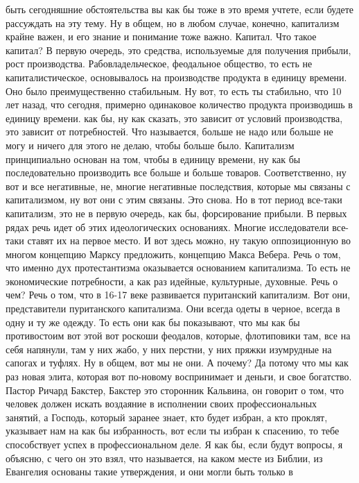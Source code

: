 быть сегодняшние обстоятельства вы как бы тоже в это время учтете, если будете
рассуждать на эту тему. Ну в общем, но в любом случае, конечно, капитализм
крайне важен, и его знание и понимание тоже важно. Капитал. Что такое капитал? В
первую очередь, это средства, используемые для получения прибыли, рост
производства. Рабовладельческое, феодальное общество, то есть не
капиталистическое, основывалось на производстве продукта в единицу времени. Оно
было преимущественно стабильным. Ну вот, то есть ты стабильно, что 10 лет назад,
что сегодня, примерно одинаковое количество продукта производишь в единицу
времени. как бы, ну как сказать, это зависит от условий производства, это
зависит от потребностей. Что называется, больше не надо или больше не могу и
ничего для этого не делаю, чтобы больше было. Капитализм принципиально основан
на том, чтобы в единицу времени, ну как бы последовательно производить все
больше и больше товаров. Соответственно, ну вот и все негативные, не, многие
негативные последствия, которые мы связаны с капитализмом, ну вот они с этим
связаны. Это снова. Но в тот период все-таки капитализм, это не в первую
очередь, как бы, форсирование прибыли. В первых рядах речь идет об этих
идеологических основаниях. Многие исследователи все-таки ставят их на первое
место. И вот здесь можно, ну такую оппозиционную во многом концепцию Марксу
предложить, концепцию Макса Вебера. Речь о том, что именно дух протестантизма
оказывается основанием капитализма. То есть не экономические потребности, а как
раз идейные, культурные, духовные. Речь о чем? Речь о том, что в 16-17 веке
развивается пуританский капитализм. Вот они, представители пуританского
капитализма. Они всегда одеты в черное, всегда в одну и ту же одежду. То есть
они как бы показывают, что мы как бы противостоим вот этой вот роскоши феодалов,
которые, флотиповики там, все на себя напянули, там у них жабо, у них перстни, у
них пряжки изумрудные на сапогах и туфлях. Ну в общем, вот мы не они. А почему?
Да потому что мы как раз новая элита, которая вот по-новому воспринимает и
деньги, и свое богатство. Пастор Ричард Бакстер, Бакстер это сторонник Кальвина,
он говорит о том, что человек должен искать воздаяние в исполнении своих
профессиональных занятий, а Господь, который заранее знает, кто будет избран, а
кто проклят, указывает нам на как бы избранность, вот если ты избран к спасению,
то тебе способствует успех в профессиональном деле. Я как бы, если будут
вопросы, я объясню, с чего он это взял, что называется, на каком месте из
Библии, из Евангелия основаны такие утверждения, и они могли быть только в

